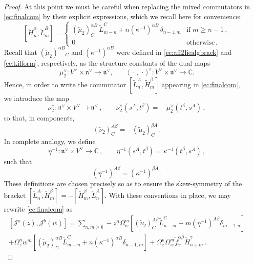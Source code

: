 \documentclass[10pt,a4paper]{amsart}
\newcommand{\C}{{\mathbb C}}
\newcommand{\CJ}{{\mathcal J}}
\newcommand{\fn}{\mathfrak{n}}
\newcommand{\tH}{{\tilde H}}
\newcommand{\tL}{{\tilde L}}
\begin{document}
\begin{proof}
At this point we must be careful when replacing the mixed commutators in \eqref{ec:finalcom} by their explicit expressions, which we recall here for convenience:
\begin{equation}
\label{ec:higherpossbrack4}
[\tH_n^\alpha,\tL_m^B]
=
\begin{cases}
(\tilde \mu_2)^{\alpha B}_C\,\tL_{m-n}^C
+ n(\kappa^{-1})^{\alpha B}\,\delta_{n-1,m}
& \text{if } m \ge n-1 \,,\\[0.3em]
0 & \text{otherwise} \,.
\end{cases}
\end{equation}
Recall that $(\tilde\mu_2)^{\alpha B}{}_C$ and $(\kappa^{-1})^{\alpha B}$ were defined in
\eqref{ec:aff2liealgbrack} and \eqref{ec:kilform}, respectively, as the structure constants of the dual maps
\begin{equation}
  \mu_2^\vee : V^\vee \times \fn^\vee \to \fn^\vee,
  \qquad
  \langle\,\cdot\,,\,\cdot\,\rangle^\vee : V^\vee \times \fn^\vee \to \C .
\end{equation}
Hence, in order to write the commutator
$[\tL_n^A,\tH_m^\beta]$ appearing in \eqref{ec:finalcom}, we introduce
the map
\begin{equation}
\nu_2^\vee : \fn^\vee \times V^\vee \to \fn^\vee \,,
\qquad
\nu_2^\vee(s^A,t^\beta)
= -\,\mu_2^\vee(t^\beta,s^A)\,,
\end{equation}
so that, in components,
\[
(\tilde \nu_2)^{A\beta}_C
= -(\tilde \mu_2)^{\beta A}_C \,.
\]
In complete analogy, we define
\begin{equation}
\eta^{-1} : \fn^\vee \times V^\vee \to \mathbb{C} \,,
\qquad
\eta^{-1}(s^A,t^\beta)
= \kappa^{-1}(t^\beta,s^A)\,,
\end{equation}
such that
\[
(\eta^{-1})^{A\beta}
= (\kappa^{-1})^{\beta A} \,.
\]
These definitions are chosen precisely so as to ensure the skew-symmetry of the bracket $[\tL_n^A,\tH_m^\beta]=-[\tH_m^\beta,\tL_n^A]$. With these conventions in place, we may rewrite \eqref{ec:finalcom} as
\begin{multline}
\label{ec:expparacomp}
        [\CJ^a(z),\CJ^b(w)]=\sum_{n,m\geq 0}-z^n\Omega_w^m\left[(\tilde{\nu}_2)^{A\beta}_C\tL_{n-m}^C + m(\eta^{-1})^{A\beta }\delta_{m-1,n}\right]\\
        +\Omega_z^nw^m\left[(\tilde{\mu}_2)^{\alpha B}_C\tL_{m-n}^C + n(\kappa^{-1})^{\alpha B}\delta_{n-1,m}\right] + \Omega_z^n\Omega_w^m \tilde{f}^{\alpha\beta}_\gamma \tH_{n+m}^\gamma\,.
\end{multline}


\medskip


\end{proof}
\end{document}
